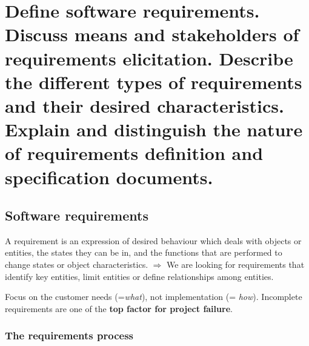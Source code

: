 \clearpage{}

\section{Define software requirements. Discuss means and stakeholders of
requirements elicitation. Describe the different types of requirements and
their desired characteristics. Explain and distinguish the nature of
requirements definition and specification documents.}

\subsection{Software requirements}



A requirement is an expression of desired behaviour which deals with objects or
entities, the states they can be in, and the functions that are performed to change states or
object characteristics. 
$\Rightarrow$ We are looking for requirements that identify key entities, limit
entities or define relationships among entities.
\newline

Focus on the customer needs (=\textit{what}), not implementation (=
\textit{how}). Incomplete requirements are one of the \textbf{top
factor for project failure}.

\subsubsection{The requirements process}

